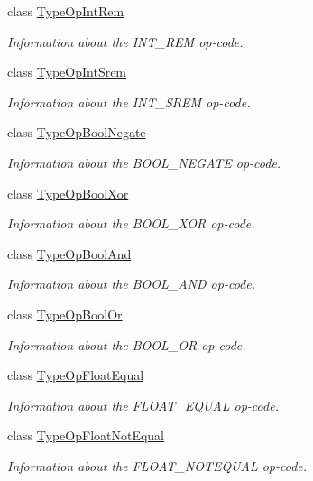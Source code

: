 \begin{DoxyCompactItemize}
class \mbox{\hyperlink{class_type_op_int_rem}{Type\+Op\+Int\+Rem}}
\begin{DoxyCompactList}\small\item\em Information about the I\+N\+T\+\_\+\+R\+EM op-\/code. \end{DoxyCompactList}\item 
class \mbox{\hyperlink{class_type_op_int_srem}{Type\+Op\+Int\+Srem}}
\begin{DoxyCompactList}\small\item\em Information about the I\+N\+T\+\_\+\+S\+R\+EM op-\/code. \end{DoxyCompactList}\item 
class \mbox{\hyperlink{class_type_op_bool_negate}{Type\+Op\+Bool\+Negate}}
\begin{DoxyCompactList}\small\item\em Information about the B\+O\+O\+L\+\_\+\+N\+E\+G\+A\+TE op-\/code. \end{DoxyCompactList}\item 
class \mbox{\hyperlink{class_type_op_bool_xor}{Type\+Op\+Bool\+Xor}}
\begin{DoxyCompactList}\small\item\em Information about the B\+O\+O\+L\+\_\+\+X\+OR op-\/code. \end{DoxyCompactList}\item 
class \mbox{\hyperlink{class_type_op_bool_and}{Type\+Op\+Bool\+And}}
\begin{DoxyCompactList}\small\item\em Information about the B\+O\+O\+L\+\_\+\+A\+ND op-\/code. \end{DoxyCompactList}\item 
class \mbox{\hyperlink{class_type_op_bool_or}{Type\+Op\+Bool\+Or}}
\begin{DoxyCompactList}\small\item\em Information about the B\+O\+O\+L\+\_\+\+OR op-\/code. \end{DoxyCompactList}\item 
class \mbox{\hyperlink{class_type_op_float_equal}{Type\+Op\+Float\+Equal}}
\begin{DoxyCompactList}\small\item\em Information about the F\+L\+O\+A\+T\+\_\+\+E\+Q\+U\+AL op-\/code. \end{DoxyCompactList}\item 
class \mbox{\hyperlink{class_type_op_float_not_equal}{Type\+Op\+Float\+Not\+Equal}}
\begin{DoxyCompactList}\small\item\em Information about the F\+L\+O\+A\+T\+\_\+\+N\+O\+T\+E\+Q\+U\+AL op-\/code. \end{DoxyCompactList}\item 

\end{DoxyCompactItemize}
